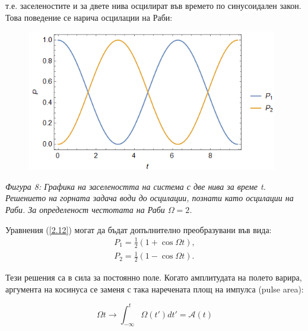     т.е. заселеностите и за двете нива осцилират във времето по синусоидален закон. Това поведение се нарича осцилации на Раби:

    \begin{figure}[H]
        \centering
        \includegraphics[width=310pt]{19.png}
    \end{figure}
    \begin{center}
        \small \textit{Фигура 8: Графика на заселеността на система с две нива за време t. Решението на горната задача води до осцилации, познати като осцилации на Раби. За определеност честотата на Раби
        $\Omega = 2$.}
    \end{center}
    
    Уравнения (\ref{2.12}) могат да бъдат допълнително преобразувани във вида:
    \begin{subequations} \label{2.1}
        \begin{align}
            P_1 = \frac{1}{2}\left(1+\cos\Omega t\right),\\
            P_2 = \frac{1}{2}\left(1-\cos\Omega t\right).
        \end{align}
    \end{subequations}

    Тези решения са в сила за постоянно поле. Когато амплитудата на полето варира, аргумента на косинуса се заменя с така наречената площ на импулса (pulse area):

    \begin{equation}
        \Omega t \rightarrow \int_{-\infty}^{t}\Omega(t')dt' = \mathcal{A}(t)
    \end{equation}


